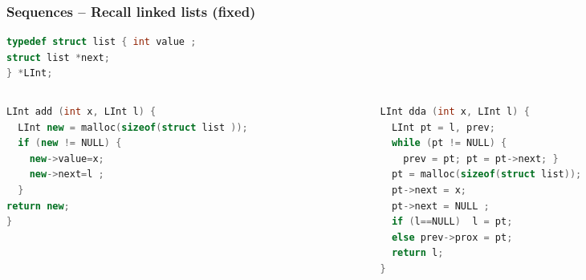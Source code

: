 \documentclass[aspectratio=169]{beamer}
\begin{document}
\begin{frame}[fragile]\frametitle{Sequences -- Recall linked lists (fixed)}
  
\begin{lstlisting}[language=C++,emph={list,LInt}]
typedef struct list { int value ;
struct list *next;
} *LInt;
\end{lstlisting}

\begin{columns}
\begin{column}{.48\textwidth}
\begin{lstlisting}[language=C++, emph={prev,LInt}]
LInt add (int x, LInt l) {
  LInt new = malloc(sizeof(struct list ));
  if (new != NULL) {
    new->value=x;
    new->next=l ;
  }
return new;
}
\end{lstlisting}
%
\end{column}
\begin{column}{.50\textwidth}
%
\begin{lstlisting}[language=C++, emph={prev,LInt}]
LInt dda (int x, LInt l) {
  LInt pt = l, prev;
  while (pt != NULL) {
    prev = pt; pt = pt->next; }
  pt = malloc(sizeof(struct list));
  pt->next = x;
  pt->next = NULL ;
  if (l==NULL)  l = pt;
  else prev->prox = pt;
  return l;
}
\end{lstlisting}
%
\end{column}
\end{columns}

~\\[-6mm]
\end{frame}
\end{document}
